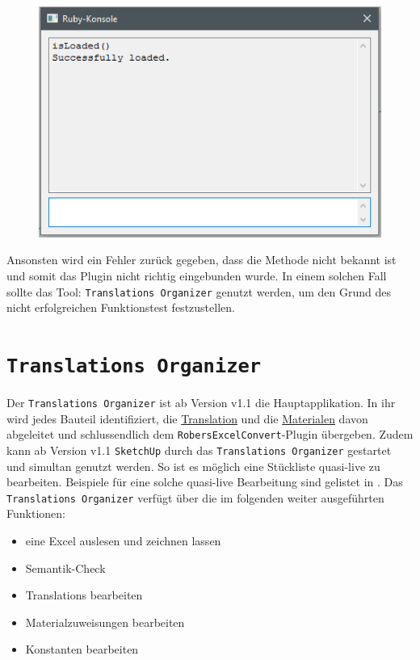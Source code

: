 \documentclass{book}
\newcommand{\sketchup}{\texttt{SketchUp}\xspace}
\newcommand{\robersexcelconvert}{\texttt{RobersExcelConvert}\xspace}
\newcommand{\assisttool}{\texttt{Translations Organizer}\xspace}
\begin{document}
			\begin{figure}[H]
				\centering
				\includegraphics[scale=0.6]{pics/funktionstest.png}
				\label{funktionstest-success}
			\end{figure}
			
			Ansonsten wird ein Fehler zurück gegeben, dass die Methode nicht bekannt ist und somit das Plugin nicht richtig eingebunden wurde. In einem solchen Fall sollte das Tool: \assisttool genutzt werden, um den Grund des nicht erfolgreichen Funktionstest festzustellen.
	\chapter{\assisttool}\label{assisttool}
		Der \assisttool ist ab Version v1.1 die Hauptapplikation. In ihr wird jedes Bauteil identifiziert, die \hyperref[Translation]{Translation} und die \hyperref[Material]{Materialen} davon abgeleitet und schlussendlich dem \robersexcelconvert-Plugin übergeben. Zudem kann ab Version v1.1 \sketchup durch das \assisttool gestartet und simultan genutzt werden. So ist es möglich eine Stückliste quasi-live zu bearbeiten. Beispiele für eine solche quasi-live Bearbeitung sind gelistet in %
		. Das \assisttool verfügt über die im folgenden weiter ausgeführten Funktionen:
			\begin{itemize}
				\item eine Excel auslesen und zeichnen lassen
				\item Semantik-Check
				\item Translations bearbeiten
				\item Materialzuweisungen bearbeiten
				\item Konstanten bearbeiten
			\end{itemize}
\end{document}
